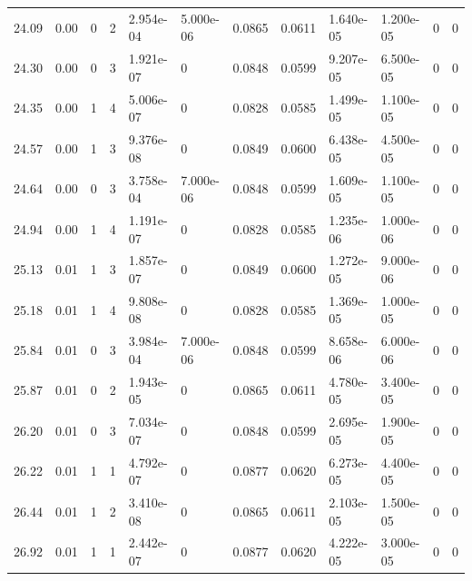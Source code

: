 \documentclass[preview]{standalone}
\begin{document}
{{{\begin{tabular}{L{1.2cm}C{1.2cm} C{0.3cm}C{0.5cm} C{1.4cm}C{1.4cm} C{1.4cm}C{1.4cm} C{1.6cm}C{1.6cm} C{1.6cm}C{1.6cm}}
  24.09  &  0.00  & 0     &  2 &  2.954e-04  & 5.000e-06  &  0.0865&   0.0611& 1.640e-05 & 1.200e-05   &  0 & 0  \\ 
  24.30  &  0.00  & 0     &  3 &  1.921e-07  & 0  &  0.0848&   0.0599& 9.207e-05 & 6.500e-05   &  0 & 0  \\ 
  24.35  &  0.00  & 1     &  4 &  5.006e-07  & 0  &  0.0828&   0.0585& 1.499e-05 & 1.100e-05   &  0 & 0  \\ 
  24.57  &  0.00  & 1     &  3 &  9.376e-08  & 0  &  0.0849&   0.0600& 6.438e-05 & 4.500e-05   &  0 & 0  \\ 
  24.64  &  0.00  & 0     &  3 &  3.758e-04  & 7.000e-06  &  0.0848&   0.0599& 1.609e-05 & 1.100e-05   &  0 & 0  \\ 
  24.94  &  0.00  & 1     &  4 &  1.191e-07  & 0  &  0.0828&   0.0585& 1.235e-06 & 1.000e-06   &  0 & 0  \\ 
  25.13  &  0.01  & 1     &  3 &  1.857e-07  & 0  &  0.0849&   0.0600& 1.272e-05 & 9.000e-06   &  0 & 0  \\ 
  25.18  &  0.01  & 1     &  4 &  9.808e-08  & 0  &  0.0828&   0.0585& 1.369e-05 & 1.000e-05   &  0 & 0  \\ 
  25.84  &  0.01  & 0     &  3 &  3.984e-04  & 7.000e-06  &  0.0848&   0.0599& 8.658e-06 & 6.000e-06   &  0 & 0  \\ 
  25.87  &  0.01  & 0     &  2 &  1.943e-05  & 0  &  0.0865&   0.0611& 4.780e-05 & 3.400e-05   &  0 & 0  \\ 
  26.20  &  0.01  & 0     &  3 &  7.034e-07  & 0  &  0.0848&   0.0599& 2.695e-05 & 1.900e-05   &  0 & 0  \\ 
  26.22  &  0.01  & 1     &  1 &  4.792e-07  & 0  &  0.0877&   0.0620& 6.273e-05 & 4.400e-05   &  0 & 0  \\ 
  26.44  &  0.01  & 1     &  2 &  3.410e-08  & 0  &  0.0865&   0.0611& 2.103e-05 & 1.500e-05   &  0 & 0  \\ 
  26.92  &  0.01  & 1     &  1 &  2.442e-07  & 0  &  0.0877&   0.0620& 4.222e-05 & 3.000e-05   &  0 & 0  \\ 
\hline 
\end{tabular} 

}}}
\end{document}
